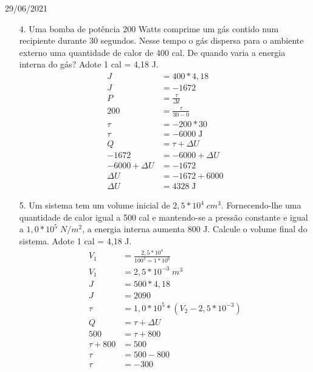 \documentclass{SchoolBook}
\begin{document}
\begin{day}{29/06/2021}
\begin{enumerate}
            \item[4.] Uma bomba de potência 200 Watts comprime um gás contido num recipiente durante 30 segundos. Nesse tempo o gás dispersa para o ambiente externo uma quantidade de calor de 400 cal. De quando varia a energia interna do gás? Adote 1 cal = 4,18 J.
            \begin{align*}
                   J &= 400 * 4,18 \\
                   J &= -1672      \\[3pt]
                   P &= \frac{\tau}{\Delta t} \\
                 200 &= \frac{\tau}{30 - 0}   \\
                \tau &= -200 * 30             \\
                \tau &= -6000\;\si{\joule}    \\[3pt]
                   Q &= \tau + \Delta U  \\
                -1672 &= -6000 + \Delta U \\
                -6000 + \Delta U &= -1672 \\
                        \Delta U &= -1672 + 6000 \\
                        \Delta U &= 4328\;\si{\joule}
            \end{align*}
            
            \item[5.] Um sistema tem um volume inicial de $2,5 * 10^4\;cm^3$. Fornecendo-lhe uma quantidade de calor igual a 500 cal e mantendo-se a pressão constante e igual a $1,0 * 10^5\;N/m^2$, a energia interna aumenta 800 J. Calcule o volume final do sistema. Adote 1 cal = 4,18 J.
            \begin{align*}
                 V_1 &= \frac{2,5 * 10^4}{100^3 = 1 * 10^6} \\
                 V_1 &= 2,5 * 10^{-3}\;m^3 \\[3pt]
                 
                   J &= 500 * 4,18 \\
                   J &= 2090       \\[3pt]
                   
                \tau &= 1,0 * 10^5 * (V_2 - 2,5 * 10^{-3}) \\
                   
                         Q &= \tau + \Delta U \\
                       500 &= \tau + 800      \\
                \tau + 800 &= 500             \\
                      \tau &= 500 - 800       \\
                      \tau &= -300            \\[3pt]
                

\end{align*}
\end{enumerate}
\end{day}
\end{document}
